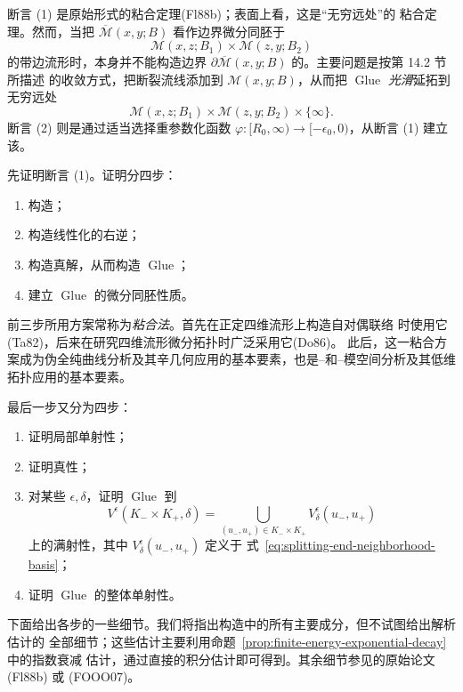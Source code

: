断言 (1) 是\personFloer{}原始形式的粘合定理(Fl88b)；表面上看，这是“无穷远处”的
粘合定理。然而，当把 $\overline{\mathcal M}(x,y;B)$ 看作边界微分同胚于
\[
 \mathcal M(x,z;B_1)\times\mathcal M(z,y;B_2)
\]
的带边流形时，\termGluingMap{}本身并不能构造边界
$\partial\overline{\mathcal M}(x,y;B)$ 的\termCollarNeighborhood{}。主要问题是按第 14.2 节所描述
的收敛方式，把断裂流线添加到 $\mathcal M(x,y;B)$，从而把
$\operatorname{Glue}$ \emph{光滑}延拓到无穷远处
\[
 \mathcal M(x,z;B_1)\times\mathcal M(z,y;B_2)\times\{\infty\}.
\]
断言 (2) 则是通过适当选择重参数化函数
$\varphi:[R_0,\infty)\to[-\epsilon_0,0)$，从断言 (1) 建立该\termCollarNeighborhood{}。

先证明断言 (1)。证明分四步：
\begin{enumerate}[label=(\arabic*)]
\item 构造\termApproximateSolution{}；
\item 构造线性化的右逆；
\item 构造真解，从而构造 $\operatorname{Glue}$；
\item 建立 $\operatorname{Glue}$ 的微分同胚性质。
\end{enumerate}
前三步所用方案常称为\emph{\personTaubes{}粘合法}。\personTaubes{}首先在正定四维流形上构造自对偶联络
时使用它(Ta82)，\personDonaldson{}后来在研究四维流形微分拓扑时广泛采用它(Do86)。
此后，这一粘合方案成为伪全纯曲线分析及其辛几何应用的基本要素，也是\personYang{}--\personMills{}和\personSeiberg{}--\personWitten{}模空间分析及其低维拓扑应用的基本要素。

最后一步又分为四步：
\begin{enumerate}[label=(\arabic*)]
\item 证明局部单射性；
\item 证明真性；
\item 对某些 $\epsilon,\delta$，证明 $\operatorname{Glue}$ 到
\[
 V^\epsilon(K_-\times K_+,\delta)
 =\bigcup_{(u_-,u_+)\in K_-\times K_+}V_\delta^\epsilon(u_-,u_+)
\]
上的满射性，其中 $V_\delta^\epsilon(u_-,u_+)$ 定义于
式~\eqref{eq:splitting-end-neighborhood-basis}；
\item 证明 $\operatorname{Glue}$ 的整体单射性。
\end{enumerate}

下面给出各步的一些细节。我们将指出构造中的所有主要成分，但不试图给出解析估计的
全部细节；这些估计主要利用命题~\ref{prop:finite-energy-exponential-decay}中的指数衰减
估计，通过直接的积分估计即可得到。其余细节参见\personFloer{}的原始论文 (Fl88b) 或
(FOOO07)。

